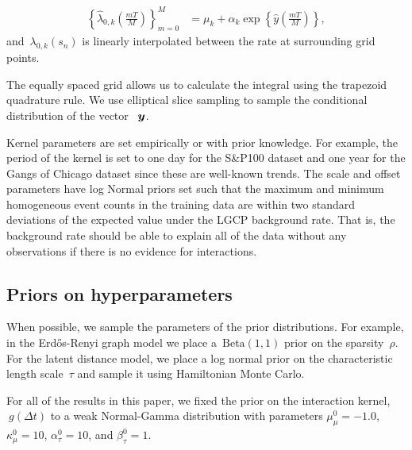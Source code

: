 \begin{align*}
\left\{\hat{\lambda}_{0,k}\left(\frac{mT}{M}\right)\right\}_{m=0}^M &= \mu_k + \alpha_k\exp\left\{\hat{y}\left(\frac{mT}{M}\right)\right\},
\end{align*}
and~${\lambda_{0,k}(s_n)}$ is linearly interpolated between the rate
at surrounding grid points.

The equally spaced grid allows us to calculate the integral using the
trapezoid quadrature rule. We use elliptical slice sampling
\cite{Murray-2010} to sample the conditional distribution of the
vector ~$\boldsymbol{y}$.

Kernel parameters are set empirically or with prior knowledge. For
example, the period of the kernel is set to one day for the S\&P100
dataset and one year for the Gangs of Chicago dataset since these are
well-known trends. The scale and offset parameters have log Normal
priors set such that the maximum and minimum homogeneous event counts
in the training data are within two standard deviations of the
expected value under the LGCP background rate. That is, the background
rate should be able to explain all of the data without any
observations if there is no evidence for interactions.

\subsection{Priors on hyperparameters}
When possible, we sample the parameters of the prior
distributions. For example, in the Erd\H{o}s-Renyi graph model we
place a~${\mathrm{Beta}(1,1)}$ prior on the sparsity~$\rho$. For the
latent distance model, we place a log normal prior on the
characteristic length scale~${\tau}$ and sample it using Hamiltonian
Monte Carlo.

For all of the results in this paper, we fixed the prior on the
interaction kernel,${~g(\Delta t)}$ to a weak Normal-Gamma
distribution with parameters ${\mu_\mu^0=-1.0}$, ${\kappa_\mu^0=10}$,
${\alpha_\tau^0=10}$, and ${\beta_\tau^0=1}$.

